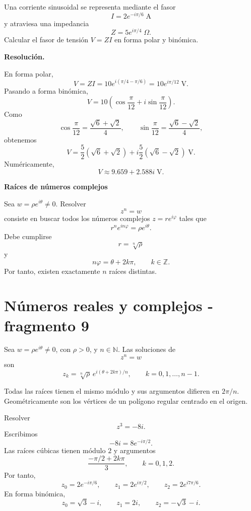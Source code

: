 \begin{solvedexercise}
Una corriente sinusoidal se representa mediante el fasor
\[
I=2e^{-i\pi/6}\;\mathrm{A}
\]
y atraviesa una impedancia
\[
Z=5e^{i\pi/4}\;\Omega.
\]
Calcular el fasor de tensión \(V=ZI\) en forma polar y binómica.

\textbf{Resolución.}\par\smallskip
En forma polar,
\[
V=ZI=10e^{i(\pi/4-\pi/6)}=10e^{i\pi/12}\;\mathrm{V}.
\]
Pasando a forma binómica,
\[
V=10\left(\cos\frac{\pi}{12}+i\sin\frac{\pi}{12}\right).
\]
Como
\[
\cos\frac{\pi}{12}=\frac{\sqrt6+\sqrt2}{4},
\qquad
\sin\frac{\pi}{12}=\frac{\sqrt6-\sqrt2}{4},
\]
obtenemos
\[
V=\frac52(\sqrt6+\sqrt2)
+i\frac52(\sqrt6-\sqrt2)\;\mathrm{V}.
\]
Numéricamente,
\[
V\approx9.659+2.588i\;\mathrm{V}.
\]
\end{solvedexercise}

\textbf{Raíces de números complejos}

Sea \(w=\rho e^{i\theta}\neq0\). Resolver
\[
z^n=w
\]
consiste en buscar todos los números complejos \(z=re^{i\varphi}\) tales que
\[
r^ne^{in\varphi}=\rho e^{i\theta}.
\]
Debe cumplirse
\[
r=\sqrt[n]{\rho}
\]
y
\[
n\varphi=\theta+2k\pi,
\qquad k\in\mathbb{Z}.
\]
Por tanto, existen exactamente \(n\) raíces distintas.


\section{Números reales y complejos - fragmento 9}
\begin{proposition}
Sea \(w=\rho e^{i\theta}\neq0\), con \(\rho>0\), y \(n\in\mathbb{N}\). Las soluciones de
\[
z^n=w
\]
son
\[
z_k=\sqrt[n]{\rho}\,e^{i(\theta+2k\pi)/n},
\qquad k=0,1,\ldots,n-1.
\]
\end{proposition}

Todas las raíces tienen el mismo módulo y sus argumentos difieren en \(2\pi/n\). Geométricamente son los vértices de un polígono regular centrado en el origen.

\begin{example}
Resolver
\[
z^3=-8i.
\]
Escribimos
\[
-8i=8e^{-i\pi/2}.
\]
Las raíces cúbicas tienen módulo \(2\) y argumentos
\[
\frac{-\pi/2+2k\pi}{3},\qquad k=0,1,2.
\]
Por tanto,
\[
z_0=2e^{-i\pi/6},\qquad
z_1=2e^{i\pi/2},\qquad
z_2=2e^{i7\pi/6}.
\]
En forma binómica,
\[
z_0=\sqrt3-i,
\qquad
z_1=2i,
\qquad
z_2=-\sqrt3-i.
\]
\end{example}

\begin{center}
\end{center}

